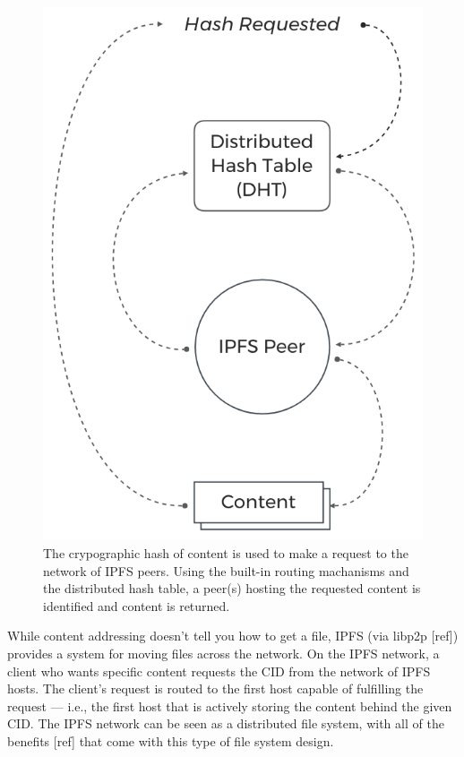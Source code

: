 \documentclass{comjnl}
\begin{document}
\begin{figure}
  \includegraphics[width=\linewidth]{figures/Hash_Request.png}
  \caption{The crypographic hash of content is used to make a request to the network of IPFS peers. Using the built-in routing machanisms and the distributed hash table, a peer(s) hosting the requested content is identified and content is returned. }
  \label{fig:contentaddressing}
\end{figure}

While content addressing doesn’t tell you how to get a file, IPFS (via libp2p [ref]) provides a system for moving files across the network.  On the IPFS network, a client who wants specific content requests the CID from the network of IPFS hosts. The client's request is routed to the first host capable of fulfilling the request — i.e., the first host that is actively storing the content behind the given CID. The IPFS network can be seen as a distributed file system, with all of the benefits [ref] that come with this type of file system design.
\end{document}
